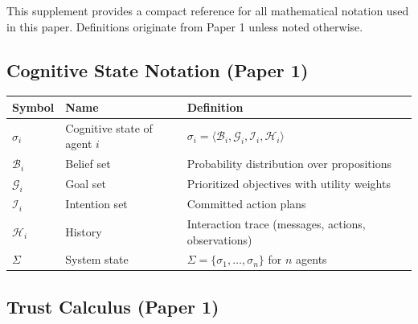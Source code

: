 \documentclass[
]{article}
\newcounter{none} %
\begin{document}
This supplement provides a compact reference for all mathematical
notation used in this paper. Definitions originate from Paper 1
\cite{friedman2026cogsec1} unless noted otherwise.

\subsection{Cognitive State Notation (Paper
1)}\label{cognitive-state-notation-paper-1}

{\def\LTcaptype{none} %
\begin{longtable}[]{@{}
  >{\raggedright\arraybackslash}p{}
  >{\raggedright\arraybackslash}p{}
  >{\raggedright\arraybackslash}p{}@{}}
\toprule\noalign{}
\begin{minipage}[b]{\linewidth}\raggedright
Symbol
\end{minipage} & \begin{minipage}[b]{\linewidth}\raggedright
Name
\end{minipage} & \begin{minipage}[b]{\linewidth}\raggedright
Definition
\end{minipage} \\
\midrule\noalign{}
\endhead
\bottomrule\noalign{}
\endlastfoot
\(\sigma_i\) & Cognitive state of agent \(i\) &
\(\sigma_i = \langle \mathcal{B}_i, \mathcal{G}_i, \mathcal{I}_i, \mathcal{H}_i \rangle\) \\
\(\mathcal{B}_i\) & Belief set & Probability distribution over
propositions \\
\(\mathcal{G}_i\) & Goal set & Prioritized objectives with utility
weights \\
\(\mathcal{I}_i\) & Intention set & Committed action plans \\
\(\mathcal{H}_i\) & History & Interaction trace (messages, actions,
observations) \\
\(\Sigma\) & System state & \(\Sigma = \{\sigma_1, \ldots, \sigma_n\}\)
for \(n\) agents \\
\end{longtable}
}

\subsection{Trust Calculus (Paper 1)}\label{trust-calculus-paper-1}
\end{document}
